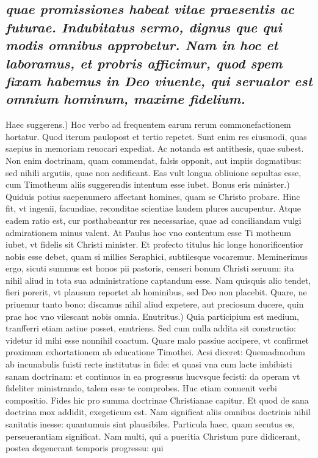 \documentclass{article}
\begin{document}
\begin{pages}
\subsection*{\textit{quae promissiones habeat vitae praesentis ac futurae. Indubitatus sermo, dignus que qui modis omnibus approbetur. Nam in hoc et laboramus, et probris afficimur, quod spem fixam habemus in Deo viuente, qui seruator est omnium hominum, maxime fidelium. }}\pstart Haec suggerens.) Hoc verbo ad frequentem earum rerum commonefactionem hortatur. Quod iterum paulopost et tertio repetet. Sunt enim res eiusmodi, quas saepius in memoriam reuocari expediat. Ac notanda est antithesis, quae subest. Non enim doctrinam, quam commendat, falsis opponit, aut impiis dogmatibus: sed nihili argutiis, quae non aedificant. Eas vult longua obliuione sepultas esse, cum Timotheum aliis suggerendis intentum esse iubet.  \pend\pstart Bonus eris minister.) Quiduis potius saepenumero affectant homines, quam se Christo probare. Hinc fit, vt ingenii, facundiae, reconditae scientiae laudem plures aucupentur. Atque eadem ratio est, cur posthabeantur res necessariae, quae ad conciliandam vulgi admirationem minus valent. At Paulus hoc vno contentum esse Ti motheum iubet, vt fidelis sit Christi minister. Et profecto titulus hic longe honorificentior nobis esse debet, quam si millies Seraphici, subtilesque vocaremur. Meminerimus ergo, sicuti summus est honos pii pastoris, censeri bonum Christi seruum: ita nihil aliud in tota sua administratione captandum esse. Nam quisquis alio tendet, fieri porerit, vt plausum reportet ab hominibus, sed Deo non placebit. Quare, ne priuemur tanto bono: discamus nihil aliud expetere, aut preciosum ducere, quin prae hoc vno vilescant nobis omnia.  \pend\pstart Enutritus.) Quia participium est medium, tranfferri etiam astiue posset, enutriens. Sed cum nulla addita sit constructio: videtur id mihi esse nonnihil coactum. Quare malo passiue accipere, vt confirmet proximam exhortationem ab educatione Timothei. Acsi diceret: Quemadmodum ab incunabulis fuisti recte institutus in fide: et quasi vna cum lacte imbibisti sanam doctrinam: et continuos in ea progressus hucvsque fecisti: da operam vt fideliter ministrando, talem esse te comprobes. Huc etiam conuenit verbi compositio. Fides hic pro summa doctrinae Christianae capitur. Et quod de sana doctrina mox addidit, exegeticum est. Nam significat aliis omnibus doctrinis nihil sanitatis inesse: quantumuis sint plausibiles. Particula haec, quam secutus es, perseuerantiam significat. Nam multi, qui a pueritia Christum pure didicerant, postea degenerant temporis progressu: qui\pend

\end{pages}
\end{document}
